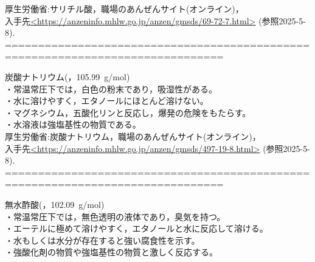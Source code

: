   厚生労働省:サリチル酸，職場のあんぜんサイト(オンライン)，\\
             入手先\url{<https://anzeninfo.mhlw.go.jp/anzen/gmsds/69-72-7.html>}
             (参照2025-5-8).
===============================================================================
\item 炭酸ナトリウム(，105.99\ g/mol)\cite{d}\\
    \hspace{0pt}・常温常圧下では，白色の粉末であり，吸湿性がある。\\
    \hspace{0pt}・水に溶けやすく，エタノールにほとんど溶けない。\\
    \hspace{0pt}・マグネシウム，五酸化リンと反応し，爆発の危険をもたらす。\\
    \hspace{0pt}・水溶液は強塩基性の物質である。\\

  厚生労働省:炭酸ナトリウム，職場のあんぜんサイト(オンライン)，\\
             入手先\url{<https://anzeninfo.mhlw.go.jp/anzen/gmsds/497-19-8.html>}
             (参照2025-5-8).
===============================================================================
\item 無水酢酸(，102.09\ g/mol)\cite{d}\\
    \hspace{0pt}・常温常圧下では，無色透明の液体であり，臭気を持つ。\\
    \hspace{0pt}・エーテルに極めて溶けやすく，エタノールと水に反応して溶ける。\\
    \hspace{0pt}・水もしくは水分が存在すると強い腐食性を示す。\\
    \hspace{0pt}・強酸化剤の物質や強塩基性の物質と激しく反応する。\\

\begin{minipage}[b]{0.40\textwidth}
    \centering
    \caption{無水酢酸}
    \label{fig:(CH3CO)2O}
\end{minipage}

